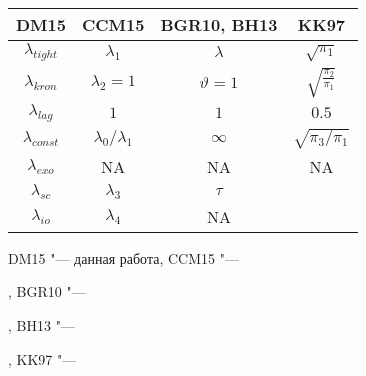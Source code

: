 \documentclass[11pt]{article} %
\newcommand{\eng}[1]{\begin{otherlanguage}{english}#1\end{otherlanguage}}
\begin{document}
\begin{center}
\begin{tabular}{cccc}
\toprule
DM15 &  CCM15 &  BGR10, BH13 & KK97  \\
\midrule
$\lambda_{tight}$ & $\lambda_1$ & $\lambda$ & $\sqrt{\pi_1}$ \\
$\lambda_{kron}$ & $\lambda_2=1$ & $\vartheta=1$ &  $\sqrt{\frac{\pi_2}{\pi_1}}$\\
$\lambda_{lag}$ & $1$ & $1$ & $0.5$\\
$\lambda_{const}$  & $\lambda_0/\lambda_1$ & $\infty$ &$ \sqrt{\pi_3/\pi_1}$\\
$\lambda_{exo}$ & NA & NA & NA\\
\midrule
$\lambda_{sc}$ & $\lambda_3$ & $\tau$ & \\
$\lambda_{io}$ & $\lambda_4$ & NA & \\
\bottomrule
\end{tabular}
\end{center}


DM15 "--- данная работа, CCM15 "--- \eng{\cite{carriero_al_2015}}, BGR10 "--- \eng{\cite{banbura_al_2010}},
BH13 "--- \eng{\cite{berg_henzel_2013}}, KK97 "--- \eng{\cite{kadiyala_karlsson_1997}}
\end{document}
